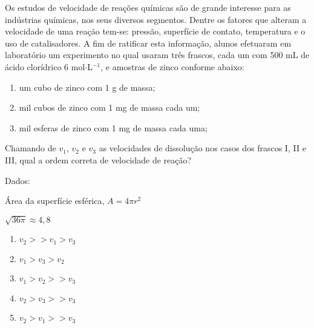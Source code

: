 Os estudos de velocidade de reações químicas são de grande interesse para as indústrias químicas, nos seus diversos segmentos.
Dentre os fatores que alteram a velocidade de uma reação tem-se: pressão, superfície de contato, temperatura e o uso de catalisadores.
A fim de ratificar esta informação, alunos efetuaram em laboratório um experimento no qual usaram três frascos, cada um com 500 mL de ácido clorídrico 6 mol$\cdot$L$^{-1}$, e amostras de zinco conforme abaixo:

\begin{enumerate}[label = Frasco \Roman*:]
	\item um cubo de zinco com 1 g de massa;
	\item mil cubos de zinco com 1 mg de massa cada um;
	\item mil esferas de zinco com 1 mg de massa cada uma;
\end{enumerate}

Chamando de $v_1$, $v_2$ e $v_3$ as velocidades de dissolução nos casos dos frascos I, II e III, qual a ordem correta de velocidade de reação?


Dados:
\begin{enumerate*}[label = , itemjoin={\qquad}]
	\item Área da superfície esférica, $A = 4 \pi r^2$
	\item $\sqrt{36\pi} \approx 4,8$
\end{enumerate*}

\begin{enumerate}[label = (\alph*)]
	\item $v_2 >> v_1 > v_3$
	\item $v_1 > v_3 > v_2$
	\item $v_1 > v_2 >> v_3$
	\item $v_2 > v_3 >> v_3$
	\item $v_2 > v_1 >> v_3$
\end{enumerate}
